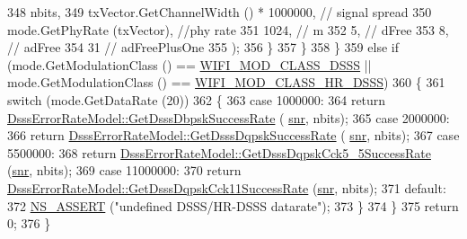 \begin{DoxyCode}
348                                    nbits,
349                                    txVector.GetChannelWidth () * 1000000, \textcolor{comment}{// signal spread}
350                                    mode.GetPhyRate (txVector), \textcolor{comment}{//phy rate}
351                                    1024, \textcolor{comment}{// m}
352                                    5,  \textcolor{comment}{// dFree}
353                                    8,  \textcolor{comment}{// adFree}
354                                    31  \textcolor{comment}{// adFreePlusOne}
355                                    );
356             \}
357         \}
358     \}
359   \textcolor{keywordflow}{else} \textcolor{keywordflow}{if} (mode.GetModulationClass () == \hyperlink{namespacens3_aa999e1221606a2b21b1eb33c2007c217aed8070e1ee089724d73fe63030cc112c}{WIFI\_MOD\_CLASS\_DSSS} || mode.GetModulationClass 
      () == \hyperlink{namespacens3_aa999e1221606a2b21b1eb33c2007c217a3c847bbae970f2de31e7b4eb7ff49840}{WIFI\_MOD\_CLASS\_HR\_DSSS})
360     \{
361       \textcolor{keywordflow}{switch} (mode.GetDataRate (20))
362         \{
363         \textcolor{keywordflow}{case} 1000000:
364           \textcolor{keywordflow}{return} \hyperlink{classns3_1_1DsssErrorRateModel_a3c17f87b4f4c5f8adf8570c96f437fd5}{DsssErrorRateModel::GetDsssDbpskSuccessRate} (
      \hyperlink{lte__amc_8m_a7543c5e4e80c828b652e0c63e4a6de70}{snr}, nbits);
365         \textcolor{keywordflow}{case} 2000000:
366           \textcolor{keywordflow}{return} \hyperlink{classns3_1_1DsssErrorRateModel_a40ce71636bd41030cfff29ccea38c588}{DsssErrorRateModel::GetDsssDqpskSuccessRate} (
      \hyperlink{lte__amc_8m_a7543c5e4e80c828b652e0c63e4a6de70}{snr}, nbits);
367         \textcolor{keywordflow}{case} 5500000:
368           \textcolor{keywordflow}{return} \hyperlink{classns3_1_1DsssErrorRateModel_a1ec2c9a616b90b2b72871ea48d7d6fb8}{DsssErrorRateModel::GetDsssDqpskCck5\_5SuccessRate}
       (\hyperlink{lte__amc_8m_a7543c5e4e80c828b652e0c63e4a6de70}{snr}, nbits);
369         \textcolor{keywordflow}{case} 11000000:
370           \textcolor{keywordflow}{return} \hyperlink{classns3_1_1DsssErrorRateModel_acce1c4e4eb5b4df017a302b66ec230be}{DsssErrorRateModel::GetDsssDqpskCck11SuccessRate}
       (\hyperlink{lte__amc_8m_a7543c5e4e80c828b652e0c63e4a6de70}{snr}, nbits);
371         \textcolor{keywordflow}{default}:
372           \hyperlink{assert_8h_a6dccdb0de9b252f60088ce281c49d052}{NS\_ASSERT} (\textcolor{stringliteral}{"undefined DSSS/HR-DSSS datarate"});
373         \}
374     \}
375   \textcolor{keywordflow}{return} 0;
376 \}
\end{DoxyCode}


